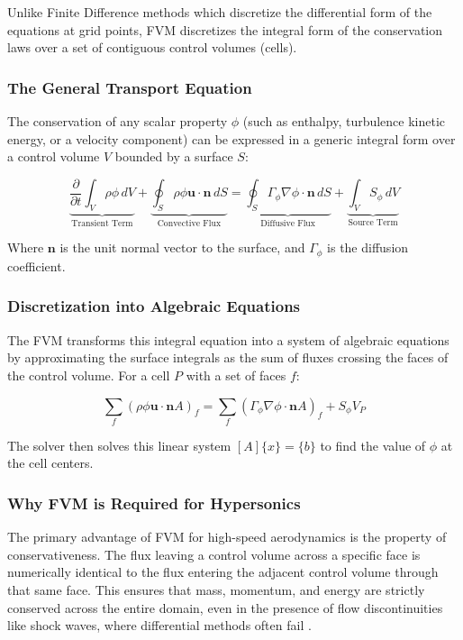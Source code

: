 Unlike Finite Difference methods which discretize the differential form of the equations at grid points, FVM discretizes the integral form of the conservation laws over a set of contiguous control volumes (cells).



\subsubsection*{The General Transport Equation}
The conservation of any scalar property $\phi$ (such as enthalpy, turbulence kinetic energy, or a velocity component) can be expressed in a generic integral form over a control volume $V$ bounded by a surface $S$:

\begin{equation}
    \underbrace{\frac{\partial}{\partial t} \int_{V} \rho \phi \, dV}_{\text{Transient Term}} + \underbrace{\oint_{S} \rho \phi \mathbf{u} \cdot \mathbf{n} \, dS}_{\text{Convective Flux}} = \underbrace{\oint_{S} \Gamma_{\phi} \nabla \phi \cdot \mathbf{n} \, dS}_{\text{Diffusive Flux}} + \underbrace{\int_{V} S_{\phi} \, dV}_{\text{Source Term}}
\end{equation}

Where $\mathbf{n}$ is the unit normal vector to the surface, and $\Gamma_{\phi}$ is the diffusion coefficient.

\subsubsection*{Discretization into Algebraic Equations}
The FVM transforms this integral equation into a system of algebraic equations by approximating the surface integrals as the sum of fluxes crossing the faces of the control volume. For a cell $P$ with a set of faces $f$:

\begin{equation}
    \sum_{f} (\rho \phi \mathbf{u} \cdot \mathbf{n} A)_f = \sum_{f} (\Gamma_{\phi} \nabla \phi \cdot \mathbf{n} A)_f + S_{\phi} V_P
\end{equation}

The solver then solves this linear system $[A] \{x\} = \{b\}$ to find the value of $\phi$ at the cell centers.

\subsubsection*{Why FVM is Required for Hypersonics}
The primary advantage of FVM for high-speed aerodynamics is the property of conservativeness. The flux leaving a control volume across a specific face is numerically identical to the flux entering the adjacent control volume through that same face. This ensures that mass, momentum, and energy are strictly conserved across the entire domain, even in the presence of flow discontinuities like shock waves, where differential methods often fail \cite{versteeg2007cfd}.



